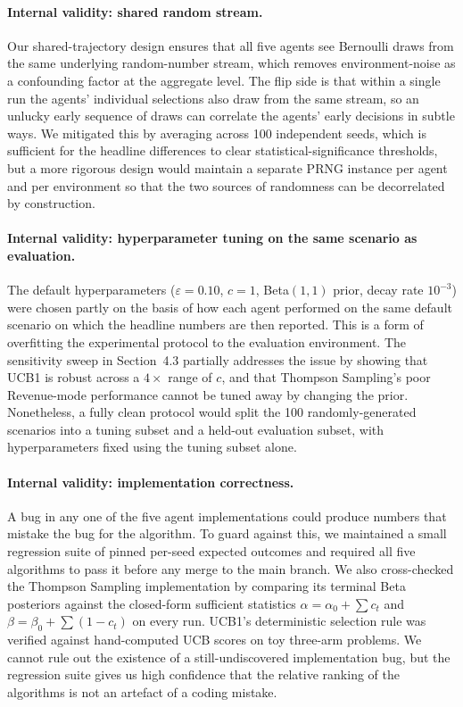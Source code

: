 \paragraph{Internal validity: shared random stream.}
Our shared-trajectory design ensures that all five agents see Bernoulli draws from the same underlying random-number stream, which removes environment-noise as a confounding factor at the aggregate level. The flip side is that within a single run the agents' individual selections also draw from the same stream, so an unlucky early sequence of draws can correlate the agents' early decisions in subtle ways. We mitigated this by averaging across 100 independent seeds, which is sufficient for the headline differences to clear statistical-significance thresholds, but a more rigorous design would maintain a separate PRNG instance per agent and per environment so that the two sources of randomness can be decorrelated by construction.

\paragraph{Internal validity: hyperparameter tuning on the same scenario as evaluation.}
The default hyperparameters ($\varepsilon = 0.10$, $c = 1$, Beta$(1,1)$ prior, decay rate $10^{-3}$) were chosen partly on the basis of how each agent performed on the same default scenario on which the headline numbers are then reported. This is a form of overfitting the experimental protocol to the evaluation environment. The sensitivity sweep in Section~4.3 partially addresses the issue by showing that UCB1 is robust across a $4\times$ range of $c$, and that Thompson Sampling's poor Revenue-mode performance cannot be tuned away by changing the prior. Nonetheless, a fully clean protocol would split the 100 randomly-generated scenarios into a tuning subset and a held-out evaluation subset, with hyperparameters fixed using the tuning subset alone.

\paragraph{Internal validity: implementation correctness.}
A bug in any one of the five agent implementations could produce numbers that mistake the bug for the algorithm. To guard against this, we maintained a small regression suite of pinned per-seed expected outcomes and required all five algorithms to pass it before any merge to the main branch. We also cross-checked the Thompson Sampling implementation by comparing its terminal Beta posteriors against the closed-form sufficient statistics $\alpha = \alpha_0 + \sum c_t$ and $\beta = \beta_0 + \sum (1 - c_t)$ on every run. UCB1's deterministic selection rule was verified against hand-computed UCB scores on toy three-arm problems. We cannot rule out the existence of a still-undiscovered implementation bug, but the regression suite gives us high confidence that the relative ranking of the algorithms is not an artefact of a coding mistake.

